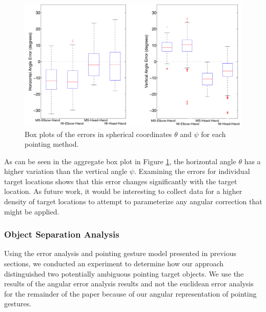 \begin{figure}[ht!]%
\centering
\includegraphics[width=1.0\textwidth]{pics/boxplots_largerfont}
\caption{Box plots of the errors in spherical coordinates $\theta$ and $\psi$ for each pointing method.}
\label{fig:pointing_angular_boxplots}
\end{figure}

As can be seen in the aggregate box plot in Figure \ref{fig:pointing_angular_boxplots}, the horizontal angle $\theta$ has a higher variation than the vertical angle $\psi$.  Examining the errors for individual target locations shows that this error changes significantly with the target location.  As future work, it would be interesting to collect data for a higher density of target locations to attempt to parameterize any angular correction that might be applied.



\subsubsection{Object Separation Analysis}


Using the error analysis and pointing gesture model presented in previous sections, we conducted an experiment to  determine how our approach distinguished two potentially ambiguous pointing target objects. We use the results of the angular error analysis results and not the euclidean error analysis for the remainder of the paper because of our angular representation of pointing gestures.

